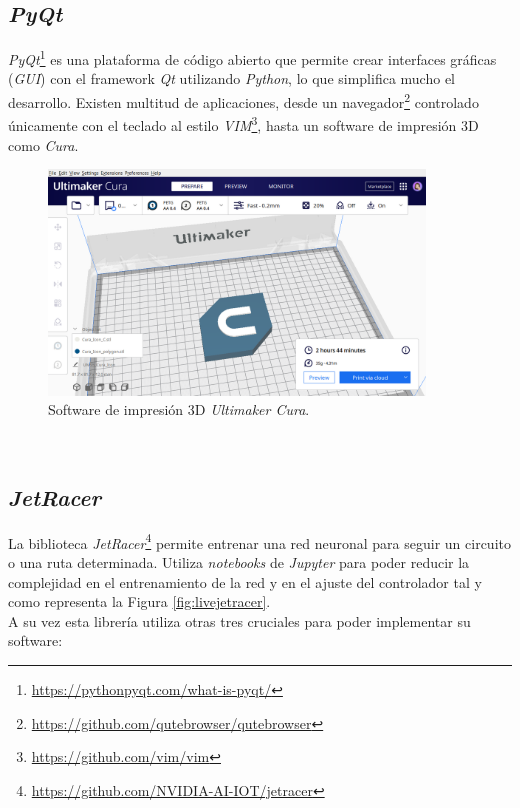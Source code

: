 \subsection{\textit{PyQt}}
\label{subsection:pyqt}
\textit{PyQt}\footnote{\url{https://pythonpyqt.com/what-is-pyqt/}} es una plataforma de código abierto que permite crear interfaces gráficas (\textit{GUI}) con el framework \textit{Qt} utilizando \textit{Python}, lo que simplifica mucho el desarrollo. Existen multitud de aplicaciones, desde un navegador\footnote{\url{https://github.com/qutebrowser/qutebrowser}} controlado únicamente con el teclado al estilo \textit{VIM}\footnote{\url{https://github.com/vim/vim}}, hasta un software de impresión 3D como \textit{Cura}.\\

\begin{figure} [h!]
	\begin{center}
		\includegraphics[width=10cm]{figs/cura}
	\end{center}
	\caption{Software de impresión 3D \textit{Ultimaker Cura}.}
	\label{fig:cura}
\end{figure}\

\subsection{\textit{JetRacer}}
\label{subsection:jetracer}
La biblioteca \textit{JetRacer}\footnote{\url{https://github.com/NVIDIA-AI-IOT/jetracer}} permite entrenar una red neuronal para seguir un circuito o una ruta determinada. Utiliza \textit{notebooks} de \textit{Jupyter} para poder reducir la complejidad en el entrenamiento de la red y en el ajuste del controlador tal y como representa la Figura \ref{fig:livejetracer}.\\

A su vez esta librería utiliza otras tres cruciales para poder implementar su software:

